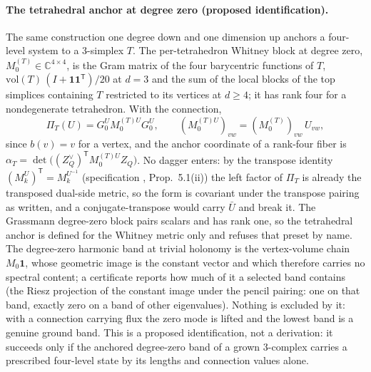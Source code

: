 \documentclass[11pt,letterpaper]{article}
\begin{document}
\paragraph{The tetrahedral anchor at degree zero (proposed identification).}
The same construction one degree down and one dimension up anchors a
four-level system to a 3-simplex $T$. The per-tetrahedron Whitney block at
degree zero, $M_0^{(T)}\in\mathbb C^{4\times4}$, is the Gram matrix of the four
barycentric functions of $T$, $\mathrm{vol}(T)\,(I+\mathbf 1\mathbf 1^{\mathsf T})/20$
at $d=3$ and the sum of the local blocks of the top simplices containing $T$
restricted to its vertices at $d\ge4$; it has rank four for a nondegenerate
tetrahedron. With the connection,
\begin{equation*}
  \Pi_T(U)=G_0^{U}M_0^{(T)U}G_0^{U},\qquad
  (M_0^{(T)U})_{vw}=(M_0^{(T)})_{vw}\,U_{vw},
\end{equation*}
since $b(v)=v$ for a vertex, and the anchor coordinate of a rank-four fiber is
$\alpha_T=\det\bigl((Z_Q^{\vee})^{\mathsf T}M_0^{(T)U}Z_Q\bigr)$. No dagger
enters: by the transpose identity $(M_k^{U})^{\mathsf T}=M_k^{U^{-1}}$
(specification \cite{whitneyspec}, Prop.~5.1(ii)) the left factor of $\Pi_T$
is already the transposed dual-side metric, so the form is covariant under the
transpose pairing as written, and a conjugate-transpose would carry $\bar U$
and break it. The Grassmann degree-zero block pairs scalars and has rank one,
so the tetrahedral anchor is defined for the Whitney metric only and refuses
that preset by name. The degree-zero harmonic band at trivial holonomy is the
vertex-volume chain $M_0\mathbf 1$, whose geometric image is the constant
vector and which therefore carries no spectral content; a certificate reports
how much of it a selected band contains (the Riesz projection of the constant
image under the pencil pairing: one on that band, exactly zero on a band of
other eigenvalues). Nothing is excluded by it: with a connection carrying
flux the zero mode is lifted and the lowest band is a genuine ground band.
This is a proposed identification, not a derivation: it succeeds only if the
anchored degree-zero band of a grown 3-complex carries a prescribed four-level
state by its lengths and connection values alone.
\end{document}
